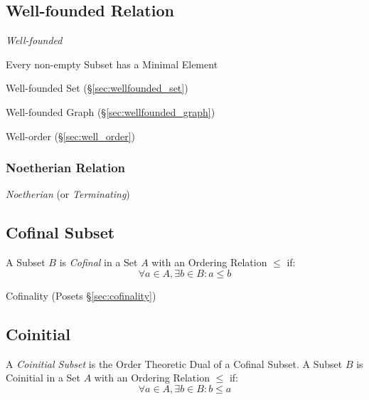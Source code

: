 \subsection{Well-founded Relation}\label{sec:well_founded}

\emph{Well-founded}

Every non-empty Subset has a Minimal Element

Well-founded Set (\S\ref{sec:wellfounded_set})

Well-founded Graph (\S\ref{sec:wellfounded_graph})

Well-order (\S\ref{sec:well_order})



\subsubsection{Noetherian Relation}\label{sec:noetherian_relation}

\emph{Noetherian} (or \emph{Terminating})



\subsection{Cofinal Subset}\label{sec:cofinal_subset}

A Subset $B$ is \emph{Cofinal} in a Set $A$ with an Ordering Relation
$\leq$ if:
\[
  \forall a \in A, \exists b \in B : a \leq b
\]

Cofinality (Posets \S\ref{sec:cofinality})



\subsection{Coinitial}\label{sec:coinitial_subset}

A \emph{Coinitial Subset} is the Order Theoretic Dual of a Cofinal
Subset. A Subset $B$ is Coinitial in a Set $A$ with an Ordering
Relation $\leq$ if:
\[
  \forall a \in A, \exists b \in B : b \leq a
\]



